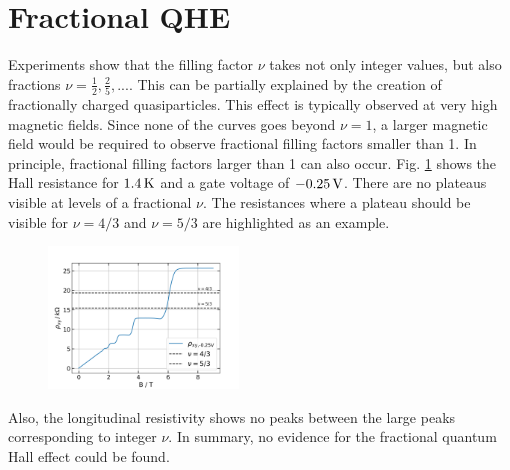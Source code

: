 \section{Fractional QHE}

Experiments show that the filling factor $\nu$ takes not only integer values, but also fractions $\nu=\frac{1}{2}, \frac{2}{5}, ...$.
This can be partially explained by the creation of fractionally charged quasiparticles.
This effect is typically observed at very high magnetic fields.
Since none of the curves goes beyond $\nu = 1$, a larger magnetic field would be required to observe fractional filling factors smaller than 1. In principle, fractional filling factors larger than 1 can also occur.
Fig. \ref{fig:FQHE} shows the Hall resistance for $1.4\, \text K$ and a gate voltage of $-0.25\, \text V$.
There are no plateaus visible at levels of a fractional $\nu$.
The resistances where a plateau should be visible for $\nu = 4/3$ and $\nu = 5/3$ are highlighted as an example.
\begin{figure}[h]
    \centering
    \includegraphics[width=0.45\textwidth]{../Images/FQHE.png}
    \caption{
        }
    \label{fig:FQHE}
\end{figure}
Also, the longitudinal resistivity shows no peaks between the large peaks corresponding to integer $\nu$.
In summary, no evidence for the fractional quantum Hall effect could be found.







